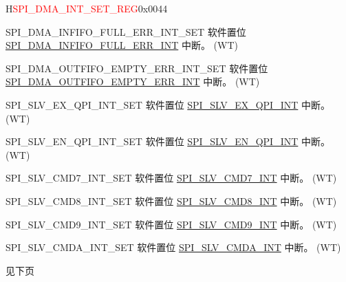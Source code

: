 \begin{register}{H}{\textcolor{red}{SPI\_DMA\_INT\_SET\_REG}}{0x{}0044}\label{regdesc:SPIDMAINTSETREG}
%
%
%
%
%
%
%
%
%
%
%
%
%
%
%
%
%
%
%
%
%
%
\regnewline%
\begin{regdesc}\begin{reglist}
\label{fielddesc:SPIDMAINFIFOFULLERRINTSET}\item [SPI\_DMA\_INFIFO\_FULL\_ERR\_INT\_SET] 软件置位 \hyperref[int:SPIINFIFOFULLERRINT]{SPI\_DMA\_INFIFO\_FULL\_ERR\_INT} 中断。 (WT)
\label{fielddesc:SPIDMAOUTFIFOEMPTYERRINTSET}\item [SPI\_DMA\_OUTFIFO\_EMPTY\_ERR\_INT\_SET] 软件置位\hyperref[int:SPIOUTFIFOEMPTYERRINT]{SPI\_DMA\_OUTFIFO\_EMPTY\_ERR\_INT} 中断。 (WT)
\label{fielddesc:SPISLVEXQPIINTSET}\item [SPI\_SLV\_EX\_QPI\_INT\_SET] 软件置位 \hyperref[int:SPISLVEXQPIINT]{SPI\_SLV\_EX\_QPI\_INT} 中断。 (WT)
\label{fielddesc:SPISLVENQPIINTSET}\item [SPI\_SLV\_EN\_QPI\_INT\_SET] 软件置位 \hyperref[int:SPISLVENQPIINT]{SPI\_SLV\_EN\_QPI\_INT} 中断。 (WT)
\label{fielddesc:SPISLVCMD7INTSET}\item [SPI\_SLV\_CMD7\_INT\_SET] 软件置位 \hyperref[int:SPISLVCMD7INT]{SPI\_SLV\_CMD7\_INT} 中断。 (WT)
\label{fielddesc:SPISLVCMD8INTSET}\item [SPI\_SLV\_CMD8\_INT\_SET] 软件置位 \hyperref[int:SPISLVCMD8INT]{SPI\_SLV\_CMD8\_INT} 中断。 (WT)
\label{fielddesc:SPISLVCMD9INTSET}\item [SPI\_SLV\_CMD9\_INT\_SET] 软件置位 \hyperref[int:SPISLVCMD9INT]{SPI\_SLV\_CMD9\_INT} 中断。 (WT)
\label{fielddesc:SPISLVCMDAINTSET}\item [SPI\_SLV\_CMDA\_INT\_SET] 软件置位 \hyperref[int:SPISLVCMDAINT]{SPI\_SLV\_CMDA\_INT} 中断。 (WT)

\item [见下页]
\end{reglist}\end{regdesc}
\end{register}

